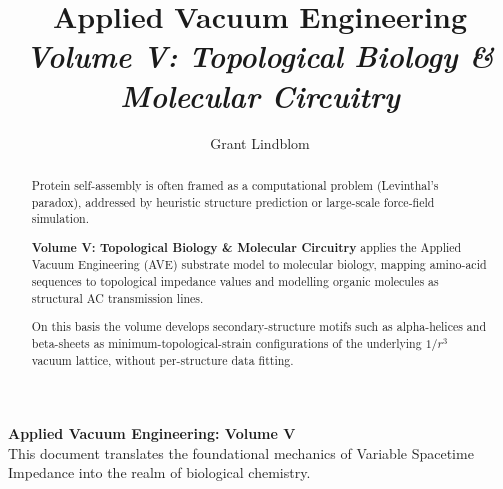 \title{\textbf{Applied Vacuum Engineering} \\ \large \textit{Volume V: Topological Biology \& Molecular Circuitry}}
\author{Grant Lindblom}
\date{}

\maketitle

\vfill
\noindent\textbf{Applied Vacuum Engineering: Volume V} \\
This document translates the foundational mechanics of Variable Spacetime Impedance into the realm of biological chemistry.

\begin{abstract}
    Protein self-assembly is often framed as a computational problem (Levinthal's paradox), addressed by heuristic structure prediction or large-scale force-field simulation. 

    \textbf{Volume V: Topological Biology \& Molecular Circuitry} applies the Applied Vacuum Engineering (AVE) substrate model to molecular biology, mapping amino-acid sequences to topological impedance values and modelling organic molecules as structural AC transmission lines. 

    On this basis the volume develops secondary-structure motifs such as alpha-helices and beta-sheets as minimum-topological-strain configurations of the underlying $1/r^3$ vacuum lattice, without per-structure data fitting.
\end{abstract}
